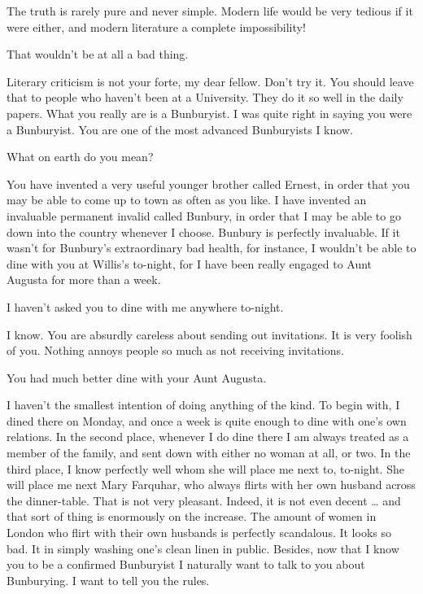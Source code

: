 \documentclass{book}
\begin{document}
\2  The truth is rarely pure and never simple.  Modern life
would be very tedious if it were either, and modern literature a
complete impossibility!

\1  That wouldn't be at all a bad thing.

\2  Literary criticism is not your forte, my dear fellow.
Don't try it.  You should leave that to people who haven't been at
a University.  They do it so well in the daily papers.  What you
really are is a Bunburyist.  I was quite right in saying you were a
Bunburyist.  You are one of the most advanced Bunburyists I know.

\1  What on earth do you mean?

\2  You have invented a very useful younger brother called
Ernest, in order that you may be able to come up to town as often
as you like.  I have invented an invaluable permanent invalid
called Bunbury, in order that I may be able to go down into the
country whenever I choose.  Bunbury is perfectly invaluable.  If it
wasn't for Bunbury's extraordinary bad health, for instance, I
wouldn't be able to dine with you at Willis's to-night, for I have
been really engaged to Aunt Augusta for more than a week.

\1  I haven't asked you to dine with me anywhere to-night.

\2  I know.  You are absurdly careless about sending out
invitations.  It is very foolish of you.  Nothing annoys people so
much as not receiving invitations.

\1  You had much better dine with your Aunt Augusta.

\2  I haven't the smallest intention of doing anything of
the kind.  To begin with, I dined there on Monday, and once a week
is quite enough to dine with one's own relations.  In the second
place, whenever I do dine there I am always treated as a member of
the family, and sent down with either no woman at all, or two.  In
the third place, I know perfectly well whom she will place me next
to, to-night.  She will place me next Mary Farquhar, who always
flirts with her own husband across the dinner-table.  That is not
very pleasant.  Indeed, it is not even decent \ldots{} and that sort
of thing is enormously on the increase.  The amount of women in
London who flirt with their own husbands is perfectly scandalous.
It looks so bad.  It in simply washing one's clean linen in public.
Besides, now that I know you to be a confirmed Bunburyist I
naturally want to talk to you about Bunburying.  I want to tell you
the rules.
\end{document}
